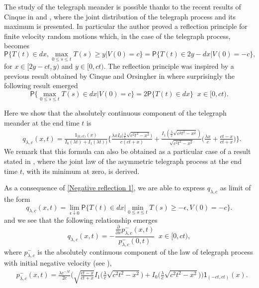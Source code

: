 \documentclass{article}
\theoremstyle{definition}
\numberwithin{equation}{section}
\begin{document}
The study of the telegraph meander is possible thanks to the recent results of Cinque in \cite{C 2023} and \cite{C 2020}, where the joint distribution of the telegraph process and its maximum is presented. In particular the author proved a reflection principle for finite velocity random motions which, in the case of the telegraph process, becomes
\begin{equation}\label{Negative reflection 1}
\mathsf{P}\{T(t) \in dx,\max_{0\leq s \leq t}T(s) \geq y|V(0) = c\} = \mathsf{P}\{T(t) \in 2y-dx|V(0) = -c\},
\end{equation}
for $x \in [2y-ct,y)$ and $y \in [0,ct)$. The reflection principle was inspired by a previous result obtained by Cinque and Orsingher in \cite{CO 2021} where surprisingly the following result emerged
\begin{equation}\label{law of maximum}\mathsf{P}\{\max_{0\leq s\leq t}T(s) \in dx|V(0) = c\} = 2\mathsf{P}\{T(t) \in dx\} \;\; x \in [0,ct).\end{equation}

Here we show that the absolutely continuous component of the telegraph meander at the end time $t$ is 
\begin{align}
&q_{\lambda,c}(x,t) =\frac{\mathsf{1}_{[0,ct)}(x)}{I_0(\lambda t)+I_1(\lambda t))}\bigg\{\frac{\lambda xI_0\big(\frac{\lambda}{c}\sqrt{c^2t^2-x^2}\big)}{c(ct+x)}+\frac{I_1(\frac{\lambda}{c}\sqrt{c^2t^2-x^2})}{\sqrt{c^2t^2-x^2}}\Big(\frac{\lambda x}{c}+\frac{ct-x}{ct+x}\Big)\bigg\}.
\end{align}
We remark that this formula can also be obtained as a particular case of a result stated in \cite{R 2021}, where the joint law of the asymmetric telegraph process at the end time $t$, with its minimum at zero, is derived.

As a consequence of \eqref{Negative reflection 1}, we are able to express $q_{\lambda,c}$ as limit of the form
\begin{equation}\label{limit definition of telegraph meander}
q_{\lambda,c}(x,t) = \lim_{\epsilon \downarrow 0}\mathsf{P}\{T(t) \in dx |\min_{0\leq s \leq t} T(s) \geq -\epsilon,V(0) = -c\}.
\end{equation}
and we see that the following relationship emerges
\begin{equation}\label{Telegraph meander t 2}q_{\lambda,c}(x,t) = -\frac{\frac{\partial}{\partial x}p^{-}_{\lambda,c}(x,t)}{p^{-}_{\lambda,c}(0,t)} \;\; x \in [0,ct),\end{equation} where $p^{-}_{\lambda,c}$ is the absolutely continuous component of the law of telegraph process with initial negative velocity (see \cite{O 1995}),
\begin{align}\label{p minus}
&p^{-}_{\lambda,c}(x,t) =\frac{\lambda e^{-\lambda t}}{2c}\bigg(\sqrt{\frac{ct- x}{ct+x}}I_1\big(\frac{\lambda}{c}\sqrt{c^2t^2-x^2}\big)+I_0\big(\frac{\lambda}{c}\sqrt{c^2t^2-x^2}\big)\bigg)\mathsf{1}_{(-ct,ct)}(x).
\end{align}
\end{document}
